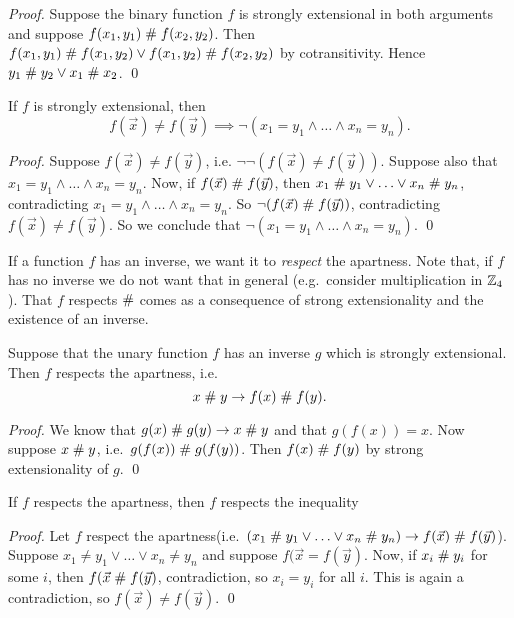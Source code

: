 \begin{proof}
Suppose the binary function $f$ is strongly extensional in both
arguments and suppose $f(x_1,y_1) \mathrel{\#} f(x_2, y_2)$. Then $f(x_1,y_1)
\mathrel{\#} f(x_1, y_2) \vee f(x_1,y_2) \mathrel{\#} f(x_2, y_2)$ by
cotransitivity.  Hence $ y_1 \mathrel{\#} y_2 \vee x_1 \mathrel{\#} x_2$. \qed
\end{proof}

\begin{lemma}\label{lemstrextneq} If $f$ is strongly extensional, then
$$ f(\vec{x}) \neq f(\vec{y}) \implies \neg(x_1 = y_1 \wedge \ldots
\wedge x_n = y_n).$$ 
\end{lemma}

\begin{proof}
Suppose $ f(\vec{x}) \neq f(\vec{y})$, i.e. $\neg\neg(f(\vec{x}) \neq
f(\vec{y}))$. Suppose also that $x_1 = y_1 \wedge \ldots
\wedge x_n = y_n$. Now, if $f(\vec{x}) \mathrel{\#} f(\vec{y})$, then $x_1
\mathrel{\#} y_1 \vee \ldots \vee x_n \mathrel{\#} y_n$, contradicting $x_1 = y_1
\wedge \ldots \wedge x_n = y_n$. So $\neg(f(\vec{x}) \mathrel{\#}
f(\vec{y}))$, contradicting $ f(\vec{x}) \neq f(\vec{y})$. So we
conclude that $\neg(x_1 = y_1 \wedge \ldots \wedge x_n = y_n)$. \qed
\end{proof}

If a function $f$ has an inverse, we want it to {\em respect\/} the
apartness. Note that, if $f$ has no inverse we do not want that in
general (e.g.\ consider multiplication in $\mathbb{Z}_4$).  That $f$ respects
$\mathrel{\#}$ comes as a consequence of strong extensionality and the
existence of an inverse.

\begin{lemma}\label{lemstrextinv}
Suppose that the unary function $f$ has an inverse $g$ which is
strongly extensional. Then $f$ respects the apartness, i.e.\
$$x\mathrel{\#} y \rightarrow f(x) \mathrel{\#} f(y).$$
\end{lemma}

\begin{proof}
We know that $g(x) \mathrel{\#} g(y) \rightarrow x\mathrel{\#} y$
and that $g(f(x))=x$. Now suppose $x\mathrel{\#} y$, i.e.\ $g(f(x))\mathrel{\#}
g(f(y))$. Then $f(x) \mathrel{\#} f(y)$ by strong extensionality of $g$. \qed
\end{proof}

\begin{lemma}\label{respneq}
If $f$ respects the apartness, then $f$ respects the inequality
\end{lemma}

\begin{proof}
Let $f$ respect the apartness(i.e.\ $(x_1\mathrel{\#} y_1 \vee \ldots \vee
x_n \mathrel{\#} y_n) \rightarrow 
f(\vec{x}) \mathrel{\#} f(\vec{y})$). Suppose  $x_1\neq y_1 \vee \ldots \vee
x_n \neq y_n$ and suppose $f(\vec{x} = f(\vec{y})$. Now, if $x_i \mathrel{\#}
y_i$ for some $i$, then $f(\vec{x} \mathrel{\#} f(\vec{y})$, contradiction,
so $x_i = y_i$ for all $i$. This is again a contradiction, so
$f(\vec{x}) \neq f(\vec{y})$. \qed
\end{proof}

